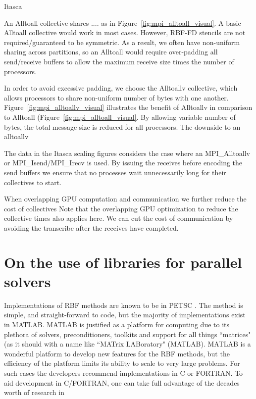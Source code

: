 Itasca

An Alltoall collective shares .... as in Figure~\ref{fig:mpi_alltoall_visual}. A basic Alltoall collective would work in most cases. However, RBF-FD stencils are not required/guaranteed to be symmetric. As a result, we often have non-uniform sharing across partitions, so an Alltoall would require over-padding all send/receive buffers to allow the maximum receive size times the number of processors. 

In order to avoid excessive padding, we choose the Alltoallv collective, which allows processors to share non-uniform number of bytes with one another. Figure~\ref{fig:mpi_alltoallv_visual} illustrates the benefit of Alltoallv in comparison to Alltoall (Figure~\ref{fig:mpi_alltoall_visual}. By allowing variable number of bytes, the total message size is reduced for all processors. The downside to an alltoallv




The data in the Itasca scaling figures considers the case where an MPI\_Alltoallv or MPI\_Isend/MPI\_Irecv is used. By issuing the receives before encoding the send buffers we ensure that no processes wait unnecessarily long for their collectives to start.

When overlapping GPU computation and communication we further reduce the cost of collectives 
Note that the overlapping GPU optimization to reduce the collective times also applies here. We can cut the cost of communication by avoiding the transcribe after the receives have completed. 


\section{On the use of libraries for parallel solvers}


Implementations of RBF methods are known to be in PETSC \cite{Yokota2010}. The method is simple, and straight-forward to code, but the majority of implementations exist in MATLAB. MATLAB is justified as a platform for computing due to its plethora of solvers, preconditioners, toolkits and support for all things ``matrices" (as it should with a name like ``MATrix LABoratory" (MATLAB). MATLAB is a wonderful platform to develop new features for the RBF methods, but the efficiency of the platform limits its ability to scale to very large problems. For such cases the developers recommend implementations in C or FORTRAN. To aid development in C/FORTRAN, one can take full advantage of the decades worth of research in

